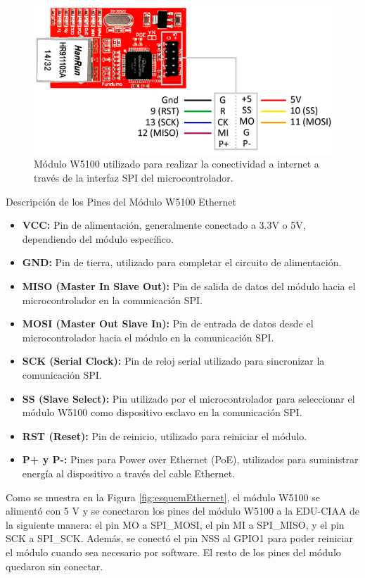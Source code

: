 \begin{figure}[H]
    \centering
    \includegraphics[width=0.7\linewidth]{Figuras/datalogger/Hardware/moduleW5100.png}
    \caption{Módulo W5100 utilizado para realizar la conectividad a internet a través de la interfaz SPI del microcontrolador.}
    \label{fig:moduleW5100}
\end{figure}
Descripción de los Pines del Módulo W5100 Ethernet
\begin{itemize}
\item \textbf{VCC:} Pin de alimentación, generalmente conectado a 3.3V o 5V, dependiendo del módulo específico.
\item \textbf{GND:} Pin de tierra, utilizado para completar el circuito de alimentación.
\item \textbf{MISO (Master In Slave Out):} Pin de salida de datos del módulo hacia el microcontrolador en la comunicación SPI.
\item \textbf{MOSI (Master Out Slave In):} Pin de entrada de datos desde el microcontrolador hacia el módulo en la comunicación SPI.
\item \textbf{SCK (Serial Clock):} Pin de reloj serial utilizado para sincronizar la comunicación SPI.
\item \textbf{SS (Slave Select):} Pin utilizado por el microcontrolador para seleccionar el módulo W5100 como dispositivo esclavo en la comunicación SPI.
\item \textbf{RST (Reset):} Pin de reinicio, utilizado para reiniciar el módulo.
\item \textbf{P+ y P-:} Pines para Power over Ethernet (PoE), utilizados para suministrar energía al dispositivo a través del cable Ethernet.
\end{itemize}

Como se muestra en la Figura \ref{fig:esquemEthernet}, el módulo W5100 se alimentó con 5 \unit{\volt} y se conectaron los pines del módulo W5100 a la EDU-CIAA de la siguiente manera: el pin MO a SPI\_MOSI, el pin MI a SPI\_MISO, y el pin SCK a SPI\_SCK. Además, se conectó el pin NSS al GPIO1 para poder reiniciar el módulo cuando sea necesario por software. El resto de los pines del módulo quedaron sin conectar.

